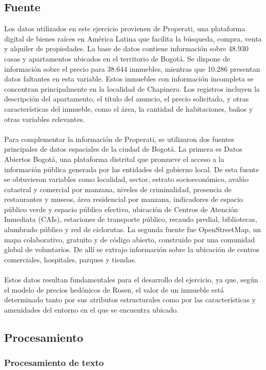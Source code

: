 \documentclass[article,11 pt]{article}
\begin{document}
\subsection{Fuente}
Los datos utilizados en este ejercicio provienen de Properati, una plataforma digital de bienes raíces en América Latina que facilita la búsqueda, compra, venta y alquiler de propiedades. La base de datos contiene información sobre 48.930 casas y apartamentos ubicados en el territorio de Bogotá. Se dispone de información sobre el precio para 38.644 inmuebles, mientras que 10.286 presentan datos faltantes en esta variable. Estos inmuebles con información incompleta se concentran principalmente en la localidad de Chapinero. Los registros incluyen la descripción del apartamento, el título del anuncio, el precio solicitado, y otras características del inmueble, como el área, la cantidad de habitaciones, baños y otras variables relevantes.
\\
\\
Para complementar la información de Properati, se utilizaron dos fuentes principales de datos espaciales de la ciudad de Bogotá. La primera es Datos Abiertos Bogotá, una plataforma distrital que promueve el acceso a la información pública generada por las entidades del gobierno local. De esta fuente se obtuvieron variables como localidad, sector, estrato socioeconómico, avalúo catastral y comercial por manzana, niveles de criminalidad, presencia de restaurantes y museos, área residencial por manzana, indicadores de espacio público verde y espacio público efectivo, ubicación de Centros de Atención Inmediata (CAIs), estaciones de transporte público, recaudo predial, bibliotecas, alumbrado público y red de ciclorutas. La segunda fuente fue OpenStreetMap, un mapa colaborativo, gratuito y de código abierto, construido por una comunidad global de voluntarios. De allí se extrajo información sobre la ubicación de centros comerciales, hospitales, parques y tiendas.
\\
\\
Estos datos resultan fundamentales para el desarrollo del ejercicio, ya que, según el modelo de precios hedónicos de Rosen, el valor de un inmueble está determinado tanto por sus atributos estructurales como por las características y amenidades del entorno en el que se encuentra ubicado.

\subsection{Procesamiento}
\subsubsection{Procesamiento de texto}
\end{document}

